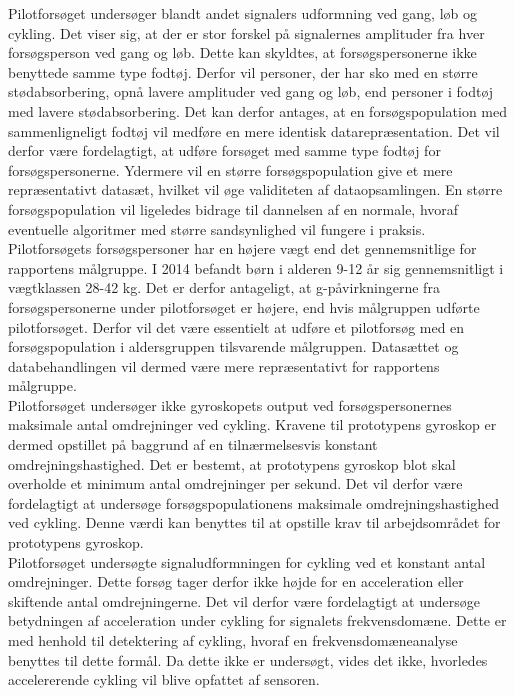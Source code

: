 Pilotforsøget undersøger blandt andet signalers udformning ved gang, løb og cykling. Det viser sig, at der er stor forskel på signalernes amplituder fra hver forsøgsperson ved gang og løb. Dette kan skyldtes, at forsøgspersonerne ikke benyttede samme type fodtøj. Derfor vil personer, der har sko med en større stødabsorbering, opnå lavere amplituder ved gang og løb, end personer i fodtøj med lavere stødabsorbering. Det kan derfor antages, at en forsøgspopulation med sammenligneligt fodtøj vil medføre en mere identisk datarepræsentation. Det vil derfor være fordelagtigt, at udføre forsøget med samme type fodtøj for forsøgspersonerne. Ydermere vil en større forsøgspopulation give et mere repræsentativt datasæt, hvilket vil øge validiteten af dataopsamlingen. En større forsøgspopulation vil ligeledes bidrage til dannelsen af en normale, hvoraf eventuelle algoritmer med større sandsynlighed vil fungere i praksis.\\
Pilotforsøgets forsøgspersoner har en højere vægt end det gennemsnitlige for rapportens målgruppe. I 2014 befandt børn i alderen 9-12 år sig gennemsnitligt i vægtklassen 28-42 kg. \citep{Rigsholspitalet2014} Det er derfor antageligt, at g-påvirkningerne fra forsøgspersonerne under pilotforsøget er højere, end hvis målgruppen udførte pilotforsøget. Derfor vil det være essentielt at udføre et pilotforsøg med en forsøgspopulation i aldersgruppen tilsvarende målgruppen. Datasættet og databehandlingen vil dermed være mere repræsentativt for rapportens målgruppe.\\
Pilotforsøget undersøger ikke gyroskopets output ved forsøgspersonernes maksimale antal omdrejninger ved cykling. Kravene til prototypens gyroskop er dermed opstillet på baggrund af en tilnærmelsesvis konstant omdrejningshastighed. Det er bestemt, at prototypens gyroskop blot skal overholde et minimum antal omdrejninger per sekund. Det vil derfor være fordelagtigt at undersøge forsøgspopulationens maksimale omdrejningshastighed ved cykling. Denne værdi kan benyttes til at opstille krav til arbejdsområdet for prototypens gyroskop.\\

Pilotforsøget undersøgte signaludformningen for cykling ved et konstant antal omdrejninger. Dette forsøg tager derfor ikke højde for en acceleration eller skiftende antal omdrejningerne. Det vil derfor være fordelagtigt at undersøge betydningen af acceleration under cykling for signalets frekvensdomæne. Dette er med henhold til detektering af cykling, hvoraf en frekvensdomæneanalyse benyttes til dette formål. Da dette ikke er undersøgt, vides det ikke, hvorledes accelererende cykling vil blive opfattet af sensoren.

